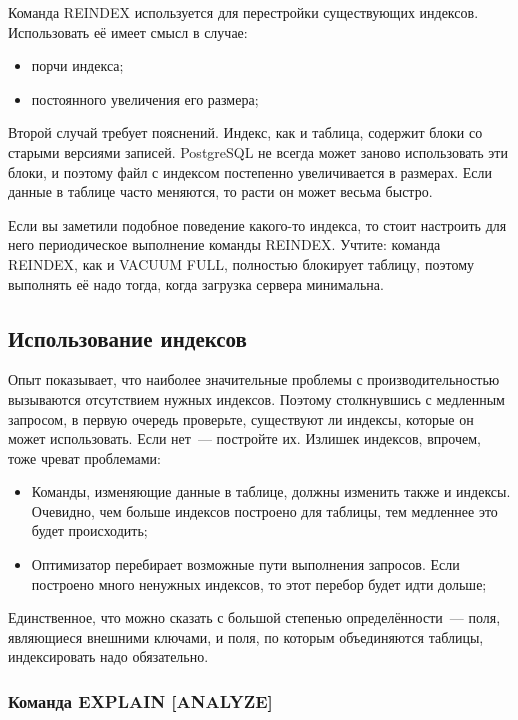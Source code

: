 Команда REINDEX используется для перестройки существующих индексов. Использовать её имеет смысл в случае:

\begin{itemize}
  \item порчи индекса;
  \item постоянного увеличения его размера;
\end{itemize}

Второй случай требует пояснений. Индекс, как и таблица, содержит блоки со старыми версиями записей. PostgreSQL не всегда может заново использовать эти блоки, и поэтому файл с индексом постепенно увеличивается в размерах. Если данные в таблице часто меняются, то расти он может весьма быстро.

Если вы заметили подобное поведение какого-то индекса, то стоит настроить для него периодическое выполнение команды REINDEX. Учтите: команда REINDEX, как и VACUUM FULL, полностью блокирует таблицу, поэтому выполнять её надо тогда, когда загрузка сервера минимальна.


\subsection{Использование индексов}
Опыт показывает, что наиболее значительные проблемы с производительностью вызываются отсутствием нужных индексов. Поэтому столкнувшись с медленным запросом, в первую очередь проверьте, существуют ли индексы, которые он может использовать. Если нет~--- постройте их. Излишек индексов, впрочем, тоже чреват проблемами:

\begin{itemize}
  \item Команды, изменяющие данные в таблице, должны изменить также и индексы. Очевидно, чем больше индексов построено для таблицы, тем медленнее это будет происходить;
  \item Оптимизатор перебирает возможные пути выполнения запросов. Если построено много ненужных индексов, то этот перебор будет идти дольше;
\end{itemize}

Единственное, что можно сказать с большой степенью определённости~--- поля, являющиеся внешними ключами, и поля, по которым объединяются таблицы, индексировать надо обязательно.


\subsubsection{Команда EXPLAIN [ANALYZE]}

